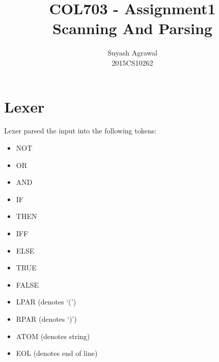 \documentclass{article}
\title{COL703 - Assignment1\\Scanning And Parsing}
\author{Suyash Agrawal\\2015CS10262}
\begin{document}
\maketitle

\section{Lexer}
Lexer parsed the input into the following tokens:
\begin{itemize}
  \item NOT
  \item OR
  \item AND
  \item IF
  \item THEN
  \item IFF
  \item ELSE
  \item TRUE
  \item FALSE
  \item LPAR (denotes `(')
  \item RPAR (denotes `)')
  \item ATOM (denotes string)
  \item EOL (denotes end of line)
\end{itemize}
\end{document}
